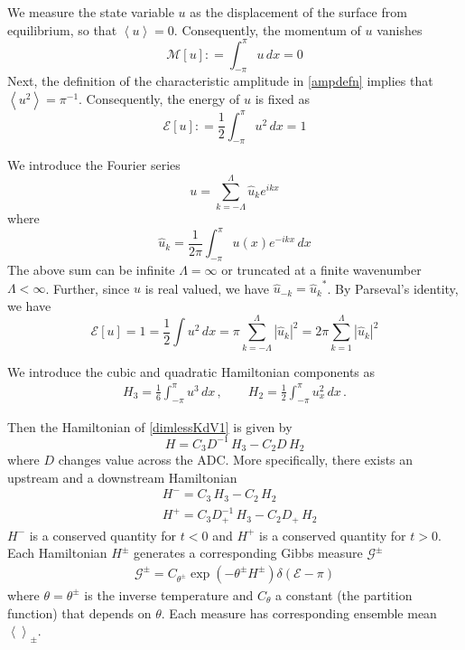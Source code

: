 \documentclass[11pt]{article}
\newcommand{\abs}[1]{\left| #1 \right|}
\newcommand{\mean}[1]{\left< #1 \right>}
\newcommand{\defeq}{\mathrel{\mathop:}=}
\newcommand{\drat}{D}
\newcommand{\dratdn}{\drat_+}
\newcommand{\En}{\mathcal{E}}
\newcommand{\Mo}{\mathcal{M}}
\newcommand{\uhat}{\hat{u}}
\newcommand{\Ham}{H}
\newcommand{\Hup}{\Ham^{-}}
\newcommand{\Hdn}{\Ham^{+}}
\newcommand{\Hupdn}{\Ham^{\pm}}
\newcommand{\Gibbs}{\mathcal{G}}
\newcommand{\Gupdn}{\Gibbs^{\pm}}
\newcommand{\thupdn}{\theta^{\pm}}
\newcommand{\dx}{\, dx}
\begin{document}
We measure the state variable $u$ as the displacement of the surface from equilibrium, so that $\mean{u} = 0$. Consequently, the momentum of $u$ vanishes
\begin{equation}
\Mo[u] \defeq \int_{-\pi}^{\pi} u \dx = 0
\end{equation}
Next, the definition of the characteristic amplitude in \eqref{ampdefn} implies that $\mean{u^2} = \pi^{-1}$. Consequently, the energy of $u$ is fixed as
\begin{equation}
\En[u] \defeq \frac{1}{2} \int_{-\pi}^{\pi} u^2 \dx = 1
\end{equation}

We introduce the Fourier series
\begin{equation}
u = \sum_{k=-\Lambda}^{\Lambda} \uhat_k e^{i k x}
\end{equation}
where
\begin{equation}
\uhat_k = \frac{1}{2 \pi} \int_{-\pi}^{\pi} u(x) e^{-i k x} \dx
\end{equation}
The above sum can be infinite $\Lambda = \infty$ or truncated at a finite wavenumber $\Lambda < \infty$.
Further, since $u$ is real valued, we have $\uhat_{-k} = {\uhat_{k}}^*$.
By Parseval's identity, we have
\begin{equation}
\En[u] = 1 = \frac{1}{2} \int u^2 \dx = \pi \sum_{k=-\Lambda}^{\Lambda} \abs{\uhat_k}^2 = 2 \pi \sum_{k=1}^{\Lambda} \abs{\uhat_k}^2
\end{equation}

We introduce the cubic and quadratic Hamiltonian components as
\begin{align}
H_3 = \frac{1}{6} \int_{-\pi}^{\pi} u^3 \dx	\, , \qquad
H_2 = \frac{1}{2} \int_{-\pi}^{\pi} u_x^2 \dx	\, .
\end{align}

Then the Hamiltonian of \eqref{dimlessKdV1} is given by
\begin{equation}
\Ham = C_3 \drat^{-1} \, H_3 - C_2 \drat \, H_2
\end{equation}
where $\drat$ changes value across the ADC. More specifically, there exists an upstream and a downstream Hamiltonian
\begin{align}
&\Hup = C_3 \, H_3 - C_2 \, H_2 \\
&\Hdn = C_3 \dratdn^{-1} \, H_3 - C_2 \dratdn \, H_2
\end{align}
$\Hup$ is a conserved quantity for $t<0$ and $\Hdn$ is a conserved quantity for $t>0$. Each Hamiltonian $\Ham^{\pm}$ generates a corresponding Gibbs measure $\Gupdn$ 
\begin{align}
\Gupdn = C_{\thupdn} \exp(-\thupdn \Hupdn) \delta(\En - \pi)
\end{align}
where $\theta = \thupdn$ is the inverse temperature and $C_{\theta}$ a constant (the partition function) that depends on $\theta$. Each measure has corresponding ensemble mean $\mean{}_{\pm}$. 
\end{document}

